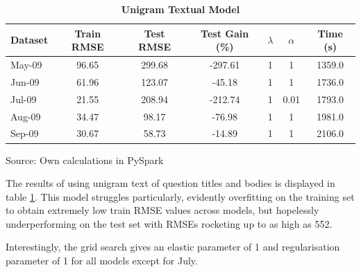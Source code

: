 \documentclass[11pt,preprint, authoryear]{article}
\numberwithin{equation}{section}
\begin{document}
\begin{longtable}[htbp] {@{} lcccccc @{}} 
\caption{\textbf{Unigram Textual Model}} 
\label{tab:rand_token_model} \\
\toprule
\textbf{Dataset} &  \textbf{Train RMSE} &  \textbf{Test RMSE} &  \textbf{Test Gain (\%)} & \textbf{$\lambda$} & \textbf{$\alpha$} &  \textbf{Time (s)} \\
\midrule
May-09 &             96.65 &         299.68 &         -297.61 &               1 &              1 &          1359.0 \\
Jun-09 &             61.96 &         123.07 &          -45.18 &               1 &              1 &          1736.0 \\
Jul-09 &             21.55 &         208.94 &         -212.74 &               1 &              0.01 &          1793.0 \\
Aug-09 &             34.47 &          98.17 &          -76.98 &               1 &              1 &          1981.0 \\
Sep-09 &             30.67 &          58.73 &          -14.89 &               1 &              1 &          2106.0 \\
\bottomrule
\end{longtable}\begin{center} Source: Own calculations in PySpark\end{center}

\normalsize

The results of using unigram text of question titles and bodies is
displayed in table \ref{tab:rand_token_model}. This model struggles
particularly, evidently overfitting on the training set to obtain
extremely low train RMSE values across models, but hopelessly
underperforming on the test set with RMSEs rocketing up to as high as
552.

Interestingly, the grid search gives an elastic parameter of 1 and
regularisation parameter of 1 for all models except for July.

\footnotesize
\end{document}
